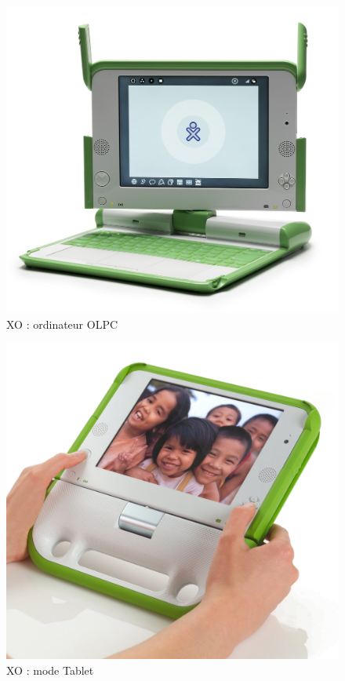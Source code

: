 \begin{figure}[H]
  \centering
  \includegraphics[width=.6\textwidth]{../resources/illustrations/olpc2}
  \caption{XO : ordinateur \gls{OLPC}}
\end{figure}
\begin{minipage}{.5\linewidth}
  \begin{figure}[H]
    \includegraphics[width=\textwidth]{../resources/illustrations/olpc1}
    \caption{XO : mode Tablet}
  \end{figure}
\end{minipage}

